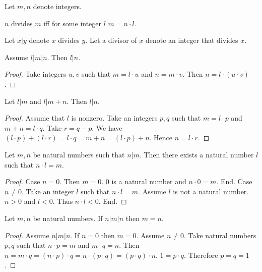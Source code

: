 \documentclass{article}
\begin{document}
\begin{forthel}

Let $m,n$ denote integers.

\begin{definition}
$n$ divides $m$ iff for some integer $l$ $m = n \cdot l$.
\end{definition}

Let $x | y$ denote $x$ divides $y$.
Let a divisor of $x$ denote an integer that divides $x$.

\begin{lemma}
Assume $l | m | n$.
Then $l | n$.
\end{lemma}
\begin{proof}
Take integers $u,v$ such that 
$m = l \cdot u$ and $n = m \cdot v$.
Then $n = l \cdot (u \cdot v)$.
\end{proof}

\begin{lemma}
Let $l | m$ and $l | m + n$.
Then $l | n$.
\end{lemma}
\begin{proof}
Assume that $l$ is nonzero.
Take an integers $p,q$ such that $m = l \cdot p$ and $m + n = l \cdot q$.
Take $r = q - p$.
We have 
$(l \cdot p) + (l \cdot r) = l \cdot q = m + n = (l \cdot p) + n$.
Hence $n = l \cdot r$.
\end{proof}

\begin{lemma}
Let $m,n$ be natural numbers such that $n | m$.
Then there exists a natural number $l$ such that $n \cdot l = m$.
\end{lemma}
\begin{proof}
Case $n = 0$. Then $m = 0$. $0$ is a natural number and $n \cdot 0 = m$. End.
Case $n \neq 0$.
Take an integer $l$ such that $n \cdot l = m$.
Assume $l$ is not a natural number.
$n > 0$ and $l < 0$. Thus $n \cdot l < 0$. End.
\end{proof}

\begin{lemma}
Let $m,n$ be natural numbers.
If $n | m | n$ then $m=n$.
\end{lemma}
\begin{proof}
Assume $n | m | n$.
If $n = 0$ then $m = 0$. Assume $n \neq 0$.
Take natural numbers $p,q$ such that $n \cdot p = m$ and $m \cdot q = n$.
Then $n = m \cdot q = (n \cdot p) \cdot q = n \cdot (p \cdot q) = (p \cdot q) \cdot n$. $1 = p \cdot q$. Therefore $p=q=1$.
\end{proof}

\end{forthel}
\end{document}
